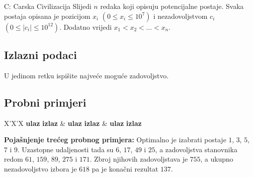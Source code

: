 \begin{statement}[
  timelimit=1.5 s,
  memorylimit=512 MiB,
]{C: Carska Civilizacija}
Slijedi $n$ redaka koji opisuju potencijalne postaje. Svaka postaja opisana je
pozicijom $x_i$ $(0 \le x_i \le 10^7)$ i nezadovoljstvom $c_i$ $(0 \le |c_i|
\le 10^{12})$. Dodatno vrijedi $x_1 < x_2 < \ldots < x_n$.

\subsection*{Izlazni podaci}
U jedinom retku ispišite najveće moguće zadovoljstvo.

\subsection*{Probni primjeri}
\begin{tabularx}{\textwidth}{X'X'X}
  \textbf{ulaz}
  \linespread{1}{}
  \textbf{izlaz}
  \linespread{1}{} &
  \textbf{ulaz}
  \linespread{1}{}
  \textbf{izlaz}
  \linespread{1}{} &
  \textbf{ulaz}
  \linespread{1}{}
  \textbf{izlaz}
  \linespread{1}{}
\end{tabularx}

\textbf{Pojašnjenje trećeg probnog primjera:}
Optimalno je izabrati postaje $1$, $3$, $5$, $7$ i $9$.  Uzastopne udaljenosti
tada su $6$, $17$, $49$ i $25$, a zadovoljstva stanovnika redom $61$, $159$,
$89$, $275$ i $171$.  Zbroj njihovih zadovoljstava je $755$, a ukupno
nezadovoljstvo izbora je $618$ pa je konačni rezultat $137$.

\end{statement}

